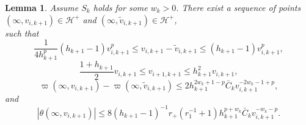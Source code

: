\documentclass{article}
\newtheorem{lemma}{Lemma}[proposition]
\begin{document}
\begin{lemma}
Assume $S_k$ holds for some $w_k>0$.
There exist a sequence of
points $(\infty,v_{i,k+1})\in\mathcal{H}^+$ and
$(\infty,\tilde{v}_{i,k+1})\in\mathcal{H}^+$,
\[

\]
such that
\begin{equation}
\label{polla}
\frac1{4h_{k+1}^p}(h_{k+1}-1)v_{i,k+1}^p\le v_{i,k+1}-\tilde{v}_{i,k+1}
\le (h_{k+1}-1)v_{i,k+1}^p,
\end{equation}
\begin{equation}
\label{*?}
\frac{1+h_{k+1}}2v_{i,k+1}\le v_{i+1,k+1}\le h_{k+1}^2v_{i,k+1},
\end{equation}
\begin{equation}
\label{polla2}
\varpi(\infty,v_{i,k+1})-\varpi(\infty,\tilde{v}_{i,k+1})
\le 2h_{k+1}^{2w_k+1-p}\bar{C}_kv_{i,k+1}^{-2w_k-1+p},
\end{equation}
and 
\begin{equation}
\label{kalogia9}
|\theta(\infty, v_{i,k+1})|\le 
8(h_{k+1}-1)^{-1}r_+(r_1^{-1}+1)h_{k+1}^{p+w_k}\bar{C}_k
v_{i,k+1}^{-w_k-p}.
\end{equation}
\end{lemma}
\end{document}
